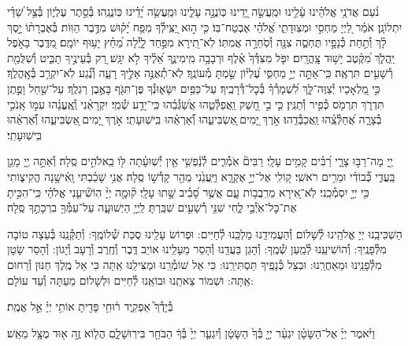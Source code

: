 \documentclass[twoside, openany, parskip=half, 11pt]{book}
\begin{document}
נֹ֨עַם אֲדֹנָ֥י אֱלֹהֵ֗ינוּ עָ֫לֵ֥ינוּ וּמַֽעֲשֵׂ֣ה יָ֭דֵינוּ כּֽוֹנֲנָ֣ה עָלֵ֑ינוּ וּמַֽעֲשֵׂ֥ה יָ֝דֵ֗ינוּ כּֽוֹנֲנֵֽהוּ׃
בְּ֯סֵ֣תֶר עֶלְי֑וֹן בְּ֯צֵ֥ל שַׁ֝דַּ֗י יִתְלוֹנָֽן׃
אֹמַ֗ר לַ֭יְיָ מַחְסִ֣י וּמְצֽוּדָתִ֑י אֱ֝לֹהַ֗י אֶבְטַח־בּֽוֹ׃
כִּ֤י ה֣וּא יַ֭צִּֽילְ֯ךָ מִפַּ֥ח יָ֝ק֗וּשׁ מִדֶּ֥בֶר הַוּֽוֹת׃
בְּ֯אֶבְרָת֨וֹ יָ֣סֶךְ לָ֗ךְ וְ֯תַ֣חַת כְּ֯נָפָ֣יו תֶּחְסֶ֑ה צִנָּ֖ה וְ֯סֹֽחֵרָ֣ה אֲמִתּֽוֹ׃
לֹֽא־תִ֭ירָא מִפַּ֣חַד לָ֑יְ֯לָה מֵ֝חֵ֗ץ יָע֥וּף יוֹמָֽם׃
מִ֭דֶּֽבֶר בָּאֹ֣פֶל יַֽהֲלֹ֑ךְ מִ֝קֶּ֗טֶב יָשׁ֥וּד צׇֽהֳרָֽיִם׃
יִפֹּ֤ל מִצִּדְּ֯ךָ֙ אֶ֗לֶף וּרְבָבָ֥ה מִֽימִינֶ֑ךָ אֵ֝לֶ֗יךָ לֹ֣א יִגָּֽשׁ׃
רַ֭ק בְּ֯עֵינֶ֣יךָ תַבִּ֑יט וְ֯שִׁלֻּמַ֖ת רְ֯שָׁעִ֣ים תִּרְאֶֽה׃
כִּֽי־אַתָּ֣ה יְיָ֣ מַחְסִּ֑י עֶ֝לְי֗וֹן שַׂ֣מְתָּ מְ֯עוֹנֶֽךָ׃
לֹֽא־תְ֯אֻנֶּ֣ה אֵלֶ֣יךָ רָעָ֑ה וְ֯נֶ֗֝גַע לֹֽא־יִקְרַ֥ב בְּ֯אׇֽהֳלֶֽךָ׃
כִּ֣י מַ֭לְאָכָיו יְ֯צַוֶּה־לָּ֑ךְ לִ֝שְׁמָרְ֯ךָ֗ בְּ֯כׇל־דְּ֯רָכֶֽיךָ׃
עַל־כַּפַּ֥יִם יִשָּׂא֑וּנְ֯ךָ פֶּן־תִּגֹּ֖ף בָּאֶ֣בֶן רַגְלֶֽךָ׃
עַל־שַׁ֣חַל וָפֶ֣תֶן תִּדְרֹ֑ךְ תִּרְמֹ֖ס כְּ֯פִ֣יר וְ֯תַנִּֽין׃
כִּ֤י בִ֣י חָ֭שַׁק וַֽאֲפַלְּ֯טֵ֑הוּ אֲשַׂ֝גְּ֯בֵ֗הוּ כִּֽי־יָדַ֥ע שְׁ֯מִֽי׃
יִקְרָאֵ֨נִי וְֽ֯אֶֽעֱנֵ֗הוּ עִמּ֣וֹ אָֽנֹכִ֣י בְ֯צָרָ֑ה אֲ֝חַלְּ֯צֵֽ֗הוּ וַֽאֲכַבְּ֯דֵֽהוּ׃
אֹ֣רֶךְ יָ֭מִים ֖אַשְׂבִּיעֵ֑הוּ וְ֝֯אַרְאֵ֗הוּ בִּֽישֽׁוּעָתִֽי׃
אֹ֣רֶךְ יָ֭מִים ֖אַשְׂבִּיעֵ֑הוּ וְ֝֯אַרְאֵ֗הוּ בִּֽישֽׁוּעָתִֽי׃

יְ֖יָ מָה־רַבּ֣וּ צָרָ֑י רַ֝בִּ֗ים קָמִ֥ים עָלָֽי׃ רַבִּים֘ אֹֽמְ֯רִ֢ים לְ֯נַ֫פְשִׁ֥י אֵ֤ין יְ֯שֽׁוּעָ֓תָה לּ֖וֹ בֵֽאלֹהִ֣ים סֶֽלָה׃ וְ֯אַתָּ֣ה יְ֖יָ מָגֵ֥ן בַּֽעֲדִ֑י כְּ֝֯בוֹדִ֗י וּמֵרִ֥ים רֹאשִֽׁי׃ ק֭וֹלִֽי אֶל־יְיָ֣ אֶקְרָ֑א וַיַּֽעֲנֵ֙נִי מֵהַ֖ר קָדְ֯שׁ֣וֹ סֶֽלָה׃ אֲנִ֥י שָׁכַ֗בְתִּי וָֽאִ֫ישָׁ֥נָה הֱקִיצ֑וֹתִי כִּ֖י יְיָ֣ יִסְמְ֯כֵֽנִי׃ לֹֽא־אִ֭ירָא מֵרִֽבֲב֥וֹת עָ֑ם אֲשֶׁ֥ר סָ֝בִ֗יב שָׁ֣תוּ עָלָֽי׃ ק֘וּמָ֤ה יְיָ֨ הֽוֹשִׁ֘יעֵ֤נִי אֱלֹהַ֗י כִּֽי־הִכִּ֣יתָ אֶת־כׇּל־אֹֽיְ֯בַ֣י לֶ֑חִי שִׁנֵּ֖י רְ֯שָׁעִ֣ים שִׁבַּֽרְתָּ׃ לַֽיְיָ֥ הַיְשׁוּעָ֑ה עַל־עַמְּ֯ךָ֖ בִרְכָתֶ֣ךָ סֶּֽלָה׃

הַשְׁכִּיבֵֽנוּ יְיָ אֱלֹהֵֽינוּ לְ֯שָׁלוֹם וְ֯הַעֲמִידֵֽנוּ מַלְכֵּֽנוּ לְ֯חַיִּים: וּפְרוֹשׂ עָלֵֽינוּ סֻכַּת שְׁ֯לוֹמֶֽךָ: וְ֯תַקְּ֯נֵֽנוּ בְּ֯עֵצָה טוֹבָה מִלְּ֯פָנֶֽיךָ: וְ֯הוֹשִׁיעֵֽנוּ לְ֯מַֽעַן שְׁ֯מֶֽךָ: וְ֯הָגֵן בַּעֲדֵֽנוּ וְ֯הָסֵר מֵעָלֵֽינוּ אוֹיֵב דֶּֽבֶר וְ֯חֶֽרֶב וְ֯רָעָב וְ֯יָגוֹן: וְ֯הָסֵר שָׂטָן מִלְּ֯פָנֵֽינוּ וּמֵאַחֲרֵֽנוּ: וּבְצֵל כְּ֯נָפֶֽיךָ תַּסְתִּירֵֽנוּ: כִּי אֵל שׁוֹמְ֯רֵֽנוּ וּמַצִּילֵֽנוּ אַֽתָּה כִּי אֵל מֶֽלֶךְ חַנּוּן וְ֯רַחוּם אַֽתָּה: וּשְׁמוֹר צֵאתֵֽנוּ וּבוֹאֵֽנוּ לְ֯חַיִּים וּלְשָׁלוֹם מֵעַתָּה וְ֯עַד עוֹלָם:

בְּ֯יָדְ֯ךָ֮ אַפְקִ֢יד ר֫וּחִ֥י פָּדִ֖יתָ אוֹתִ֥י יְיָ֗ אֵ֣ל אֱמֶֽת׃

וַיֹּ֨אמֶר יְיָ֜ אֶל־הַשָּׂטָ֗ן יִגְעַ֨ר יְיָ֤ בְּ֯ךָ֙ הַשָּׂטָ֔ן וְ֯יִגְעַ֤ר יְיָ֙ בְּ֯ךָ֔ הַבֹּחֵ֖ר בִּירֽוּשָׁלָ֑םִ הֲל֧וֹא זֶ֦ה א֖וּד מֻצָּ֥ל מֵאֵֽשׁ׃
\end{document}
